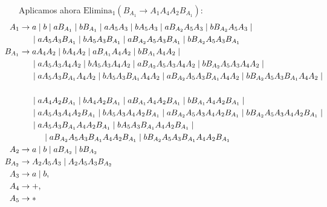 \documentclass[12pt]{article}
\begin{document}
\begin{ejercicio}[2.5 puntos]
\begin{description}
        Aplicamos ahora $\text{Elimina}_1(B_{A_1}\rightarrow A_1 A_4 A_2 B_{A_1})$:
        \begin{align*}
            \hspace{-2.5cm}A_1 &\to  a \mid b\mid a B_{A_1} \mid b B_{A_1}
                \mid  aA_5A_3 \mid bA_5A_3 \mid   a B_{A_2}A_5A_3 \mid  b B_{A_2}A_5A_3
                \mid \\ & \hspace{0.5cm} \mid  aA_5 A_3 B_{A_1} \mid bA_5 A_3 B_{A_1} \mid   a B_{A_2}A_5 A_3 B_{A_1}
                \mid b B_{A_2}A_5 A_3 B_{A_1} \\
            \hspace{-2.5cm}B_{A_1} &\to  aA_4 A_2 \mid bA_4 A_2\mid a B_{A_1}A_4 A_2 \mid b B_{A_1}A_4 A_2
                \mid \\ & \hspace{0.5cm} \mid  aA_5A_3 A_4 A_2\mid bA_5A_3A_4 A_2 \mid   a B_{A_2}A_5A_3A_4 A_2
                \mid b B_{A_2}A_5A_3A_4 A_2
                \mid \\ & \hspace{0.5cm} \mid  aA_5 A_3 B_{A_1}A_4 A_2 \mid bA_5 A_3 B_{A_1}A_4 A_2
               \mid  a B_{A_2}A_5 A_3 B_{A_1}A_4 A_2 \mid b B_{A_2}A_5 A_3 B_{A_1}A_4 A_2
                \mid \\ \hspace{-2.5cm}\\ & \hspace{0.5cm} \mid  aA_4 A_2 B_{A_1} \mid bA_4 A_2 B_{A_1}\mid a B_{A_1}A_4 A_2 B_{A_1}
                 \mid b B_{A_1}A_4 A_2 B_{A_1}
                \mid \\ & \hspace{0.5cm} \mid  aA_5A_3 A_4 A_2 B_{A_1}\mid bA_5A_3A_4 A_2 B_{A_1} 
                 \mid  a B_{A_2}A_5A_3A_4 A_2 B_{A_1} \mid b B_{A_2}A_5A_3A_4 A_2 B_{A_1}
                \mid \\ & \hspace{0.5cm} \mid  aA_5 A_3 B_{A_1}A_4 A_2 B_{A_1} \mid bA_5 A_3 B_{A_1}A_4 A_2 B_{A_1}
                \mid \\ & \hspace{1cm}  \mid  a B_{A_2}A_5 A_3 B_{A_1}A_4 A_2 B_{A_1} \mid b B_{A_2}A_5 A_3 B_{A_1}A_4 A_2 B_{A_1} \\
            \hspace{-2.5cm}A_2 &\to  a \mid b \mid a B_{A_2} \mid  b B_{A_2} \\
            \hspace{-2.5cm}B_{A_2} & \to A_2 A_5 A_3 \mid A_2 A_5 A_3 B_{A_2}\\
            \hspace{-2.5cm}A_3 &\to  a \mid b,\\
            \hspace{-2.5cm}A_4 &\to +,\\
            \hspace{-2.5cm}A_5 &\to *
        \end{align*}


\end{description}
\end{ejercicio}
\end{document}
